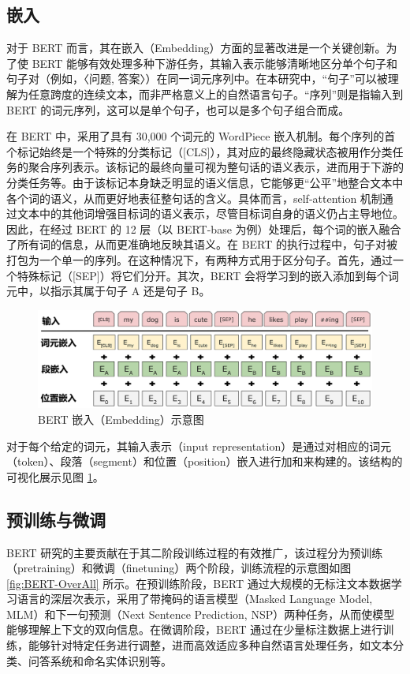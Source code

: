 \subsection{嵌入}

对于 BERT 而言，其在嵌入（Embedding）方面的显著改进是一个关键创新。为了使 BERT 能够有效处理多种下游任务，其输入表示能够清晰地区分单个句子和句子对（例如，〈问题, 答案〉）在同一词元序列中。在本研究中，“句子”可以被理解为任意跨度的连续文本，而非严格意义上的自然语言句子。“序列”则是指输入到 BERT 的词元序列，这可以是单个句子，也可以是多个句子组合而成。

在 BERT 中，采用了具有 30,000 个词元的 WordPiece 嵌入机制。每个序列的首个标记始终是一个特殊的分类标记（[CLS]），其对应的最终隐藏状态被用作分类任务的聚合序列表示。该标记的最终向量可视为整句话的语义表示，进而用于下游的分类任务等。由于该标记本身缺乏明显的语义信息，它能够更“公平”地整合文本中各个词的语义，从而更好地表征整句话的含义。具体而言，self-attention 机制通过文本中的其他词增强目标词的语义表示，尽管目标词自身的语义仍占主导地位。因此，在经过 BERT 的 12 层（以 BERT-base 为例）处理后，每个词的嵌入融合了所有词的信息，从而更准确地反映其语义。在 BERT 的执行过程中，句子对被打包为一个单一的序列。在这种情况下，有两种方式用于区分句子。首先，通过一个特殊标记（[SEP]）将它们分开。其次，BERT 会将学习到的嵌入添加到每个词元中，以指示其属于句子 A 还是句子 B。

\begin{figure}[htb]
	\centering
	\includegraphics[width=0.9\linewidth]{figures/bert_Input_Embeddings.jpg}
	\caption{BERT 嵌入（Embedding）示意图 \cite{devlin_bert_2019}}
	\label{fig:BERT-embedding}
\end{figure}

对于每个给定的词元，其输入表示（input representation）是通过对相应的词元（token）、段落（segment）和位置（position）嵌入进行加和来构建的。该结构的可视化展示见图 \ref{fig:BERT-embedding}。

\subsection{预训练与微调}

BERT 研究的主要贡献在于其二阶段训练过程的有效推广，该过程分为预训练（pretraining）和微调（finetuning）两个阶段，训练流程的示意图如图 \ref{fig:BERT-OverAll} 所示。在预训练阶段，BERT 通过大规模的无标注文本数据学习语言的深层次表示，采用了带掩码的语言模型（Masked Language Model, MLM）和下一句预测（Next Sentence Prediction, NSP）两种任务，从而使模型能够理解上下文的双向信息。在微调阶段，BERT 通过在少量标注数据上进行训练，能够针对特定任务进行调整，进而高效适应多种自然语言处理任务，如文本分类、问答系统和命名实体识别等。

